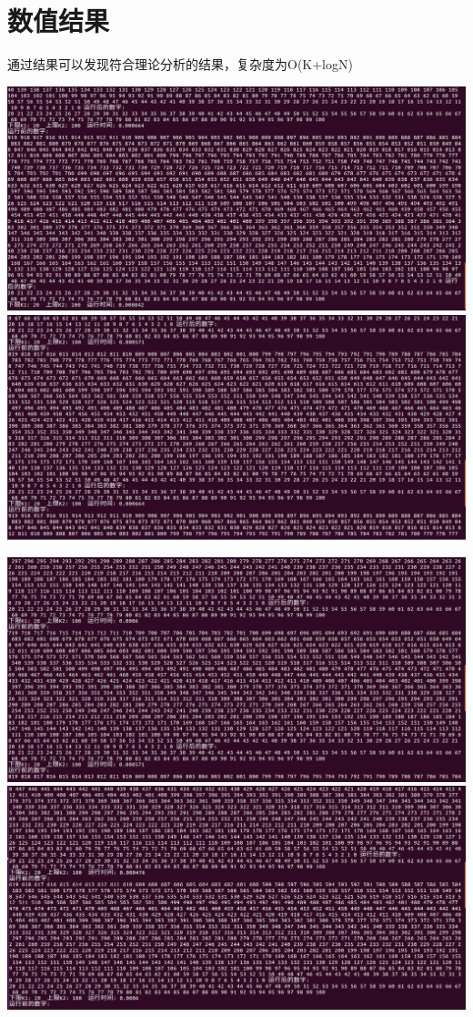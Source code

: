 \documentclass{ctexart}
\begin{document}
  \section{数值结果}
  通过结果可以发现符合理论分析的结果，复杂度为O(K+logN)
\begin{center}
  \includegraphics[scale=0.25]{1.png}
  \includegraphics[scale=0.25]{2.png}
\end{center}
\begin{center}
  \includegraphics[scale=0.25]{3.png}
  \includegraphics[scale=0.25]{4.png}
\end{center}
\end{document}
